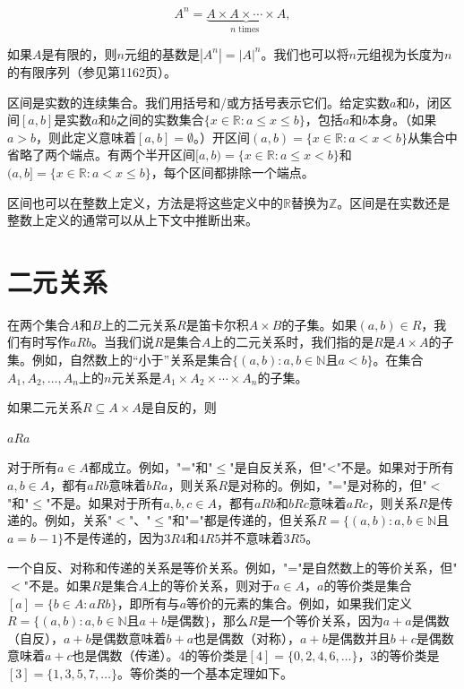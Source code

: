 \documentclass[lang=cn,newtx,10pt,scheme=chinese]{elegantbook}
\begin{document}
$$
A^n=\underbrace{A \times A \times \cdots \times A}_{n \text { times }},
$$

如果$A$是有限的，则$n$元组的基数是$|A^n|=|A|^n$。我们也可以将$n$元组视为长度为$n$的有限序列（参见第1162页）。

区间是实数的连续集合。我们用括号和/或方括号表示它们。给定实数$a$和$b$，闭区间$[a, b]$是实数$a$和$b$之间的实数集合$\{x \in \mathbb{R}: a \leq x \leq b\}$，包括$a$和$b$本身。（如果$a>b$，则此定义意味着$[a, b]=\emptyset$。）开区间$(a, b)=\{x \in \mathbb{R}: a<x<b\}$从集合中省略了两个端点。有两个半开区间$[a, b)=\{x \in \mathbb{R}: a \leq x<b\}$和$(a, b]=\{x \in \mathbb{R}: a<x \leq b\}$，每个区间都排除一个端点。

区间也可以在整数上定义，方法是将这些定义中的$\mathbb{R}$替换为$\mathbb{Z}$。区间是在实数还是整数上定义的通常可以从上下文中推断出来。

\section{二元关系}

在两个集合$A$和$B$上的二元关系$R$是笛卡尔积$A \times B$的子集。如果$(a, b) \in R$，我们有时写作$a R b$。当我们说$R$是集合$A$上的二元关系时，我们指的是$R$是$A \times A$的子集。例如，自然数上的“小于”关系是集合$\{(a, b): a, b \in \mathbb{N}$且$a<b\}$。在集合$A_1, A_2, \ldots, A_n$上的$n$元关系是$A_1 \times A_2 \times \cdots \times A_n$的子集。

如果二元关系$R \subseteq A \times A$是自反的，则

$a R a$

对于所有$a \in A$都成立。例如，"="和"$\leq$"是自反关系，但"<"不是。如果对于所有$a, b \in A$，都有$a R b$意味着$b R a$，则关系$R$是对称的。例如，"="是对称的，但"$<$"和"$\leq$"不是。如果对于所有$a, b, c \in A$，都有$a R b$和$b R c$意味着$a R c$，则关系$R$是传递的。例如，关系"$<$"、"$\leq$"和"="都是传递的，但关系$R=\{(a, b): a, b \in \mathbb{N}$且$a=b-1\}$不是传递的，因为$3 R 4$和$4 R 5$并不意味着$3 R 5$。

一个自反、对称和传递的关系是等价关系。例如，"="是自然数上的等价关系，但"$<$"不是。如果$R$是集合$A$上的等价关系，则对于$a \in A$，$a$的等价类是集合$[a]=\{b \in A: a R b\}$，即所有与$a$等价的元素的集合。例如，如果我们定义$R=\{(a, b): a, b \in \mathbb{N}$且$a+b$是偶数$\}$，那么$R$是一个等价关系，因为$a+a$是偶数（自反），$a+b$是偶数意味着$b+a$也是偶数（对称），$a+b$是偶数并且$b+c$是偶数意味着$a+c$也是偶数（传递）。4的等价类是$[4]=\{0,2,4,6, \ldots\}$，3的等价类是$[3]=\{1,3,5,7, \ldots\}$。等价类的一个基本定理如下。
\end{document}
